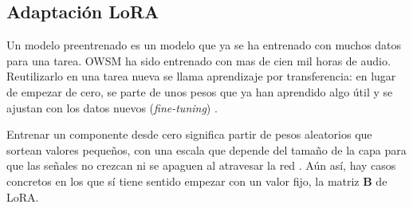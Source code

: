 

\subsection{Adaptación LoRA}
\label{sec:adaptacion}
\label{sec:lora-teoria}

Un modelo preentrenado es un modelo que ya se ha entrenado con muchos datos para una tarea. OWSM ha sido entrenado con mas de cien mil horas de audio. Reutilizarlo en una tarea nueva se llama aprendizaje por transferencia: en lugar de empezar de cero, se parte de unos pesos que ya han aprendido algo útil y se ajustan con los datos nuevos (\textit{fine-tuning}) \cite{yosinski2014transferable}.

Entrenar un componente desde cero significa partir de pesos aleatorios que sortean valores pequeños, con una escala que depende del tamaño de la capa para que las señales no crezcan ni se apaguen al atravesar la red \cite{glorot2010understanding}. Aún así, hay casos concretos en los que sí tiene sentido empezar con un valor fijo, la matriz $\mathbf{B}$ de LoRA.

